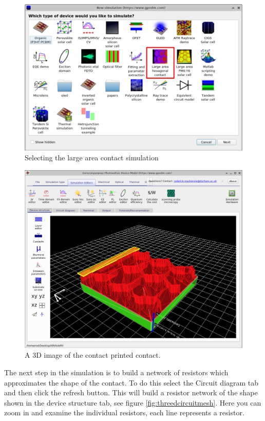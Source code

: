 \begin{figure}[H]
\centering
\includegraphics[width=\textwidth]{./images/la_0.png}
\caption{Selecting the large area contact simulation}
\label{fig:newsimlargeareacontact}
\end{figure}

\begin{figure}[H]
\centering
\includegraphics[width=\textwidth]{./images/la_1.png}
\caption{A 3D image of the contact printed contact.}
\label{fig:basecontactsimulation}
\end{figure}

The next step in the simulation is to build a network of resistors which approximates the shape of the contact. To do this select the Circuit diagram tab and then click the refresh button.  This will build a resistor network of the shape shown in the device structure tab, see figure \ref{fig:threedcircuitmesh}. Here you can zoom in and examine the individual resistors, each line represents a resistor.

